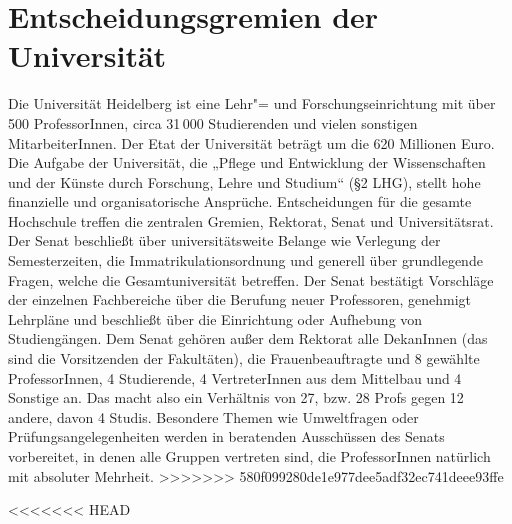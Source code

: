\section{Entscheidungsgremien der Universität}
Die Universität Heidelberg ist eine Lehr"= und Forschungseinrichtung mit
über 500 ProfessorInnen, circa 31\,000 Studierenden und vielen sonstigen
MitarbeiterInnen. Der Etat der Universität beträgt um die 620 Millionen
Euro. Die Aufgabe der Universität, die „Pflege und Entwicklung der
Wissenschaften und der Künste durch Forschung, Lehre und Studium“ (§2
LHG), stellt hohe finanzielle und organisatorische Ansprüche.
Entscheidungen für die gesamte Hochschule treffen die zentralen Gremien,
Rektorat, Senat und Universitätsrat. Der Senat beschließt über
universitätsweite Belange wie Verlegung der Semesterzeiten, die
Immatrikulationsordnung und generell über grundlegende Fragen, welche die
Gesamtuniversität betreffen. Der Senat bestätigt Vorschläge der einzelnen
Fachbereiche über die Berufung neuer Professoren, genehmigt Lehrpläne und
beschließt über die Einrichtung oder Aufhebung von Studiengängen. Dem
Senat gehören außer dem Rektorat alle DekanInnen (das sind die
Vorsitzenden der Fakultäten), die Frauenbeauftragte und 8 gewählte
ProfessorInnen, 4 Studierende, 4 VertreterInnen aus dem Mittelbau und 4
Sonstige an. Das macht also ein Verhältnis von 27, bzw. 28 Profs gegen 12
andere, davon 4 Studis. Besondere Themen wie Umweltfragen oder
Prüfungsangelegenheiten werden in beratenden Ausschüssen des Senats
vorbereitet, in denen alle Gruppen vertreten sind, die ProfessorInnen
natürlich mit absoluter Mehrheit.
>>>>>>> 580f099280de1e977dee5adf32ec741deee93ffe

<<<<<<< HEAD


